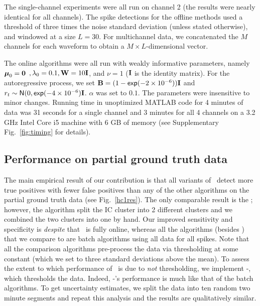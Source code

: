 % 
% 
The single-channel experiments were all run on channel 2 (the results were nearly identical for all channels).  The spike detections for the offline methods used a threshold of three times the noise standard deviation \cite{Lewicki} (unless stated otherwise), and windowed at a size $L=30$.  For multichannel data, we concatenated the $M$ channels for each waveform to obtain a $M\times L$-dimensional vector.



The online algorithms were all run with weakly informative parameters, namely  $\boldsymbol{\mu}_0=\boldsymbol{0}$ $,\lambda_0=0.1,\mathbf{W}=10\mathbf{I}$, and $\nu=1$ ($\mathbf{I}$ is the identity matrix).  
For the autoregressive process, we set $\mathbf{B}=(1-\mathsf{exp}(-2\times 10^{-6}))\mathbf{I}$ and $r_t\sim\mathsf{N}(0,\mathsf{exp}(-4\times 10^{-6})\mathbf{I}$.  $\alpha$ was set to $0.1$. The parameters were insensitive to minor changes.  Running time in unoptimized MATLAB code for 4 minutes of data was 31 seconds for a single channel and 3 minutes for all 4 channels on a 3.2 GHz Intel Core i5 machine with 6 GB of memory (see Supplementary Fig.\ \ref{fig:timing} for details).

\subsection{Performance on partial ground truth data}



The main empirical result of our contribution is that all variants of \smug\ detect more true positives with fewer false positives than any of the other algorithms on the partial ground truth data (see Fig.\ \ref{hc1res}).  The only comparable result is the ; however, the  algorithm split the IC cluster into 2 different clusters and we combined the two clusters into one by hand.  Our improved sensitivity and specificity is \emph{despite} that \smug\ is fully online, whereas all the algorithms (besides ) that we compare to are batch algorithms using all data for all spikes.   Note that all the comparison algorithms pre-process the data via thresholding at some constant (which we set to three standard deviations above the mean).  To assess the extent to which performance of \smug\ is due to \emph{not} thresholding, we implement -\smug, which thresholds the data.  Indeed, -\smug's performance is much like that of the batch algorithms.  To get uncertainty estimates, we split the data into ten random two minute segments and repeat this analysis and the results are qualitatively similar. %


